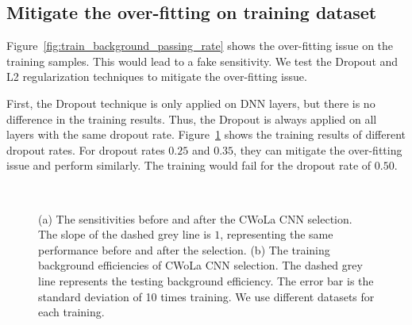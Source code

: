 \documentclass[12pt]{article}
\begin{document}
    \subsection{Mitigate the over-fitting on training dataset}%
    \label{sub:mitigate_the_over_fitting_on_training_dataset}
        Figure~\ref{fig:train_background_passing_rate} shows the over-fitting issue on the training samples. This would lead to a fake sensitivity. We test the Dropout and L2 regularization techniques to mitigate the over-fitting issue.

        First, the Dropout technique is only applied on DNN layers, but there is no difference in the training results. Thus, the Dropout is always applied on all layers with the same dropout rate. Figure~\ref{fig:sensitivity_improvement_background_pass_rate_dropout_25_35_50} shows the training results of different dropout rates. For dropout rates $0.25$ and $0.35$, they can mitigate the over-fitting issue and perform similarly. The training would fail for the dropout rate of $0.50$.
        \begin{figure}[htpb]
            \centering
             \\
            \caption{(a) The sensitivities before and after the CWoLa CNN selection. The slope of the dashed grey line is $1$, representing the same performance before and after the selection. (b) The training background efficiencies of CWoLa CNN selection. The dashed grey line represents the testing background efficiency. The error bar is the standard deviation of 10 times training. We use different datasets for each training.}
            \label{fig:sensitivity_improvement_background_pass_rate_dropout_25_35_50}
        \end{figure}
\end{document}
